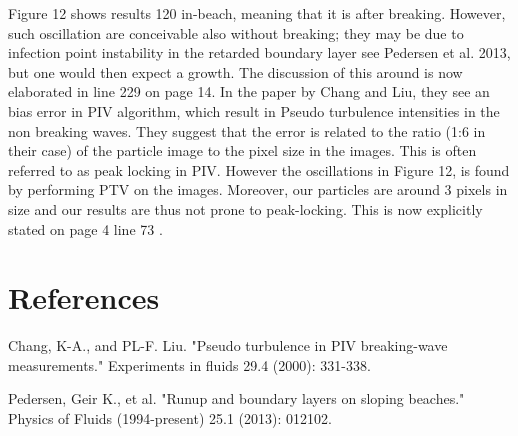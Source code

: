 \documentclass[11pt]{article}
\begin{document}
Figure 12 shows results 120 in-beach, meaning that it is after breaking. However, such oscillation are conceivable also without breaking; they may be due to infection point instability in the retarded boundary layer see Pedersen et al. 2013, but one would then expect a growth. The discussion of this around is now elaborated in line 229 on page 14. 
 In the paper by Chang and Liu, they see an bias error in PIV algorithm, which result in Pseudo turbulence intensities in the non breaking waves. They suggest that the error is related to the ratio (1:6 in their case) of the particle image to the pixel size in the images. This is often referred to as peak locking in PIV. However the oscillations in Figure 12, is found by  performing PTV on the images. Moreover, our particles are around 3 pixels in size and
our results are thus not prone to peak-locking. This is now explicitly stated on page 4 line 73 . 



\section*{References}
Chang, K-A., and PL-F. Liu. "Pseudo turbulence in PIV breaking-wave measurements." Experiments in fluids 29.4 (2000): 331-338.

Pedersen, Geir K., et al. "Runup and boundary layers on sloping beaches." Physics of Fluids (1994-present) 25.1 (2013): 012102.
\end{document}

